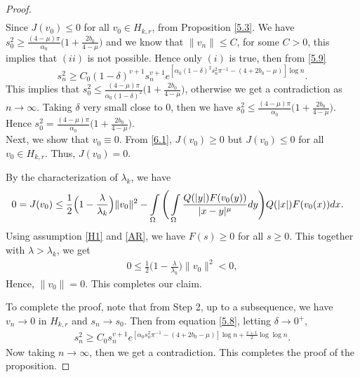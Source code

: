 \documentclass[10pt,a4paper]{amsart}
\begin{document}
\begin{proof}
\begin{align}
		\end{align}
		Since $J(v_0) \leq 0$ for all $v_0 \in H_{k,r}$, from Proposition \ref{5.3}. We have  $s_0^2 \geq \frac{(4-\mu)\pi}{\alpha_0} \Big( 1+\frac{2b_0}{4-\mu}\Big)$ and we know that $\|v_n\|\leq C$, for some $C>0$, this implies that $(ii)$ is not possible. Hence only $(i)$ is true, then from \eqref{5.9}
		\[ s_n^2 \geq C_0(1-\delta)^{v+1} s_n^{v+1} e^{[\alpha_0 (1-\delta)^2 s_n^2 \pi^{-1}-(4+2b_0-\mu)]\log{n}}.\]
		This implies that $s_0^2 \leq \frac{(4-\mu)\pi}{\alpha_0 (1-\delta)^2} \Big(1+\frac{2b_0}{4-\mu}\Big)$, otherwise we get a contradiction as $n\to \infty$. Taking $\delta$ very small close to 0, then we have $s_0^2 \leq \frac{(4-\mu)\pi}{\alpha_0}\Big(1+\frac{2b_0}{4-\mu}\Big)$. Hence $s_0^2 = \frac{(4-\mu)\pi}{\alpha_0}\Big(1+\frac{2b_0}{4-\mu}\Big)$.\\
		Next, we show that $v_0 \equiv 0$. From \eqref{6.1}, $J(v_0) \geq 0$ but $J(v_0) \leq 0$ for all $v_0 \in H_{k,r}$. Thus, $J(v_0)=0$. 
		
		By the characterization of $\lambda_k$, we have
		\begin{align*}
			0= J(v_0) & \leq \frac{1}{2} \Big(1 - \frac{\lambda}{\lambda_k}\Big)\|v_0\|^2 - \int\limits\limits_\Omega \Bigg( \int\limits\limits_\Omega \frac{Q(|y|)F(v_0(y))}{|x-y|^\mu}dy\Bigg) Q(|x|)F(v_0(x))dx.
		\end{align*}
		Using assumption \eqref{H1} and \eqref{AR}, we have $F(s)\geq 0$ for all $s\geq 0$. This together with $\lambda > \lambda_k$, we get
		\begin{align*}
			0 \leq \frac{1}{2} \Big(1 - \frac{\lambda}{\lambda_k}\Big)\|v_0\|^2 <0,
		\end{align*}
		Hence, $\|v_0\|=0$. This completes our claim.
		
		To complete the proof, note that from Step 2, up to a subsequence, we have $v_n \rightarrow 0$ in $H_{k,r}$ and $s_n \rightarrow s_0$. Then from equation \eqref{5.8}, letting $\delta \rightarrow 0^+$,
		\begin{align*}
			s_n^2 \geq C_0 s_n^{v+1}e^{[ \alpha_0 s_n^2 \pi^{-1} - (4+2b_0-\mu)]\log{n} + \frac{v+1}{2}\log{\log{n}}}.
		\end{align*}
		Now taking $n\rightarrow \infty$, then we get a contradiction. This completes the proof of the proposition.
	\end{proof}
\end{document}
